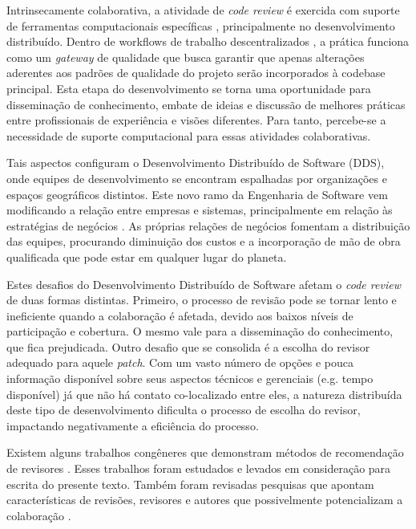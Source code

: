 \documentclass[sigconf]{acmart}
\begin{document}
Intrinsecamente colaborativa, a atividade de \textit{code review} é exercida com suporte de ferramentas computacionais específicas \cite{Bacchelli2013}, principalmente no desenvolvimento distribuído. Dentro de workflows de trabalho descentralizados \cite{gousios2016}, a prática funciona como um \textit{gateway} de qualidade que busca garantir que apenas alterações aderentes aos padrões de qualidade do projeto serão incorporados à codebase principal. Esta etapa do desenvolvimento se torna uma oportunidade para disseminação de conhecimento, embate de ideias e discussão de melhores práticas entre profissionais de experiência e visões diferentes. Para tanto, percebe-se a necessidade de suporte computacional para essas atividades colaborativas.

Tais aspectos configuram o Desenvolvimento Distribuído de Software (DDS), onde equipes de desenvolvimento se encontram espalhadas por organizações e espaços geográficos distintos. Este novo ramo da Engenharia de Software vem modificando a relação entre empresas e sistemas, principalmente em relação às estratégias de negócios \cite{audy2007}. As próprias relações de negócios fomentam a distribuição das equipes, procurando diminuição dos custos e a incorporação de mão de obra qualificada que pode estar em qualquer lugar do planeta.


Estes desafios do Desenvolvimento Distribuído de Software afetam o \textit{code review} de duas formas distintas. Primeiro, o processo de revisão pode se tornar lento e ineficiente quando a colaboração é afetada, devido aos baixos níveis de participação e cobertura. O mesmo vale para a disseminação do conhecimento, que fica prejudicada. Outro desafio que se consolida é a escolha do revisor adequado para aquele \textit{patch}. Com um vasto número de opções e pouca informação disponível sobre seus aspectos técnicos e gerenciais (e.g. tempo disponível) já que não há contato co-localizado entre eles, a natureza distribuída deste tipo de desenvolvimento dificulta o processo de escolha do revisor, impactando negativamente a eficiência do processo.

Existem alguns trabalhos congêneres que demonstram métodos de recomendação de revisores \cite{yu2014,Xia2015261,jiang2017}. Esses trabalhos foram estudados e levados em consideração para escrita do presente texto. Também foram revisadas pesquisas que apontam características de revisões, revisores e autores que possivelmente potencializam a colaboração \cite{Kemerer2009,Bird2015191,Baysal2013122}.
\end{document}
